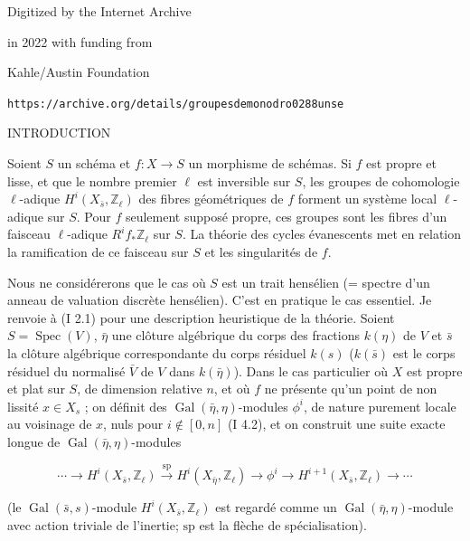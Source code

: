 \begin{center}
Digitized by the Internet Archive

in 2022 with funding from

Kahle/Austin Foundation

\bigskip
\texttt{https://archive.org/details/groupesdemonodro0288unse}
\end{center}
\clearpage

\begin{center}
INTRODUCTION
\end{center}

Soient $S$ un schéma et $f:X\longrightarrow S$ un morphisme de schémas. Si $f$ est
propre et lisse, et que le nombre premier $\ell$ est inversible sur $S$, les groupes de
cohomologie $\ell$-adique $H^i(X_{\bar s},\mathbb Z_\ell)$ des fibres géométriques de $f$ forment un système
local $\ell$-adique sur $S$. Pour $f$ seulement supposé propre, ces groupes sont les fibres
d'un faisceau $\ell$-adique $R^i f_*\mathbb Z_\ell$ sur $S$. La théorie des cycles évanescents met
en relation la ramification de ce faisceau sur $S$ et les singularités de $f$.

Nous ne considérerons que le cas où $S$ est un trait hensélien (= spectre d'un
anneau de valuation discrète hensélien). C'est en pratique le cas essentiel. Je renvoie
à (I 2.1) pour une description heuristique de la théorie. Soient $S=\operatorname{Spec}(V)$, $\bar\eta$
une clôture algébrique du corps des fractions $k(\eta)$ de $V$ et $\bar s$ la clôture algébrique
correspondante du corps résiduel $k(s)$ ($k(\bar s)$ est le corps résiduel du normalisé
$\bar V$ de $V$ dans $k(\bar\eta)$). Dans le cas particulier où $X$ est propre et plat sur
$S$, de dimension relative $n$, et où $f$ ne présente qu'un point de non lissité
$x\in X_s$ ; on définit des $\operatorname{Gal}(\bar\eta,\eta)$-modules $\phi^i$, de nature purement locale au voisinage
de $x$, nuls pour $i\notin[0,n]$ (I 4.2), et on construit une suite exacte longue
de $\operatorname{Gal}(\bar\eta,\eta)$-modules

\[
\cdots \longrightarrow H^i(X_{\bar s},\mathbb Z_\ell)
\xrightarrow{\mathrm{sp}} H^i(X_{\bar\eta},\mathbb Z_\ell)
\longrightarrow \phi^i
\longrightarrow H^{i+1}(X_{\bar s},\mathbb Z_\ell)
\longrightarrow \cdots
\]

(le $\operatorname{Gal}(\bar s,s)$-module $H^i(X_{\bar s},\mathbb Z_\ell)$ est regardé comme un
$\operatorname{Gal}(\bar\eta,\eta)$-module avec action triviale de l'inertie; $\mathrm{sp}$ est la flèche de spécialisation).

